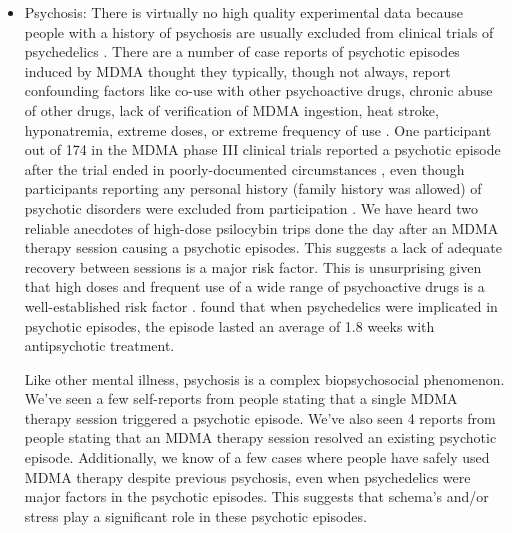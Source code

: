 \documentclass[12pt,letterpaper]{book}
\begin{document}
\begin{itemize}
    \item Psychosis: There is virtually no high quality experimental data because people with a history of psychosis are usually excluded from clinical trials of psychedelics \cite{la2022Psychosis}. There are a number of case reports of psychotic episodes induced by MDMA thought they typically, though not always, report confounding factors like co-use with other psychoactive drugs, chronic abuse of other drugs, lack of verification of MDMA ingestion, heat stroke, hyponatremia, extreme doses, or extreme frequency of use \cite{psychosisTreatment,arnovitzSchizophrenia,mcguirePsychosis,patelPsychosis,vaivaPsychosis}. One participant out of 174 in the MDMA phase III clinical trials reported a psychotic episode after the trial ended in poorly-documented circumstances \cite{powerTrip}, even though participants reporting any personal history (family history was allowed) of psychotic disorders were excluded from participation \cite{smithSystematic,mitchellMDMAClinicalTrial2}. We have heard two reliable anecdotes of high-dose psilocybin trips done the day after an MDMA therapy session causing a psychotic episodes. This suggests a lack of adequate recovery between sessions is a major risk factor. This is unsurprising given that high doses and frequent use of a wide range of psychoactive drugs is a well-established risk factor \cite{drugsPsychosis}. \textcite{psychosisTreatment} found that when psychedelics were implicated in psychotic episodes, the episode lasted an average of 1.8 weeks with antipsychotic treatment.
    
    Like other mental illness, psychosis is a complex biopsychosocial phenomenon. We've seen a few self-reports from people stating that a single MDMA therapy session triggered a psychotic episode. We've also seen 4 reports from people stating that an MDMA therapy session resolved an existing psychotic episode. Additionally, we know of a few cases where people have safely used MDMA therapy despite previous psychosis, even when psychedelics were major factors in the psychotic episodes. This suggests that schema's and/or stress play a significant role in these psychotic episodes.
\end{itemize}
\end{document}
